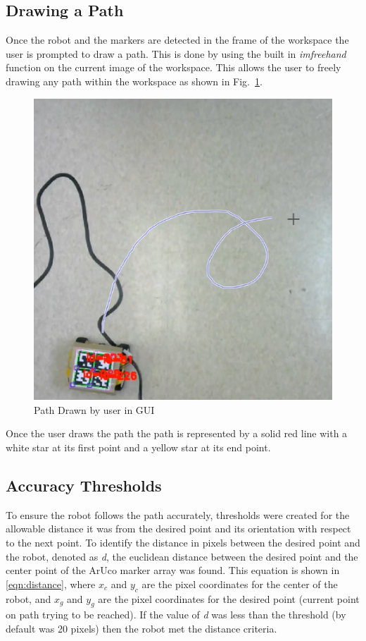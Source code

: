 \documentclass[12pt,american]{report}
\begin{document}
\subsection{Drawing a Path}

Once the robot and the markers are detected in the frame of the workspace the user is prompted to draw a path.  This is done by using the built in \textit{imfreehand} function on the current image of the workspace.  This allows the user to freely drawing any path within the workspace as shown in Fig.~\ref{fig:pathdrawn}.
\begin{figure}[h!]
\centering
\includegraphics[scale=.5]{images/pathDrawn.PNG}
\caption{Path Drawn by user in GUI}
\label{fig:pathdrawn}
\end{figure}
 Once the user draws the path the path is represented by a solid red line with a white star at its first point and a yellow star at its end point.

\subsection{Accuracy Thresholds}

To ensure the robot follows the path accurately, thresholds were created for the allowable distance it was from the desired point and its orientation with respect to the next point. To identify the distance in pixels between the desired point and the robot, denoted as \textit{d}, the euclidean distance between the desired point and the center point of the ArUco marker array was found. This equation is shown in \ref{eqn:distance}, where $x_c$ and $y_c$ are the pixel coordinates for the center of the robot, and $x_g$ and $y_g$ are the pixel coordinates for the desired point (current point on path trying to be reached). If the value of \textit{d} was less than the threshold (by default was 20 pixels) then the robot met the distance criteria.
\end{document}
